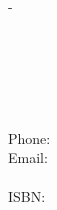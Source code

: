 \cleardoublepage
\thispagestyle{empty}
\phantom{\ }
\newpage
\AtBeginShipoutNext{\AtBeginShipoutNext{\AtBeginShipoutDiscard}}
\begin{titlingpage}
	\sffamily
	\thispagestyle{empty}
	\calccentering{\unitlength}
	\begin{adjustwidth}{\unitlength}{-\unitlength}
		\begin{adjustwidth}{-0.5cm}{-0.5cm}
			
			\noindent
			\thUniversityNameEN\\
			\thGroupNameEN\\
			\thGroupAddressStreetEN\\
			\thGroupAddressZIPCityEN\\
			\thGroupAddressCountryEN\\
			Phone: \thGroupAddressPhone\\
			Email: \thGroupAddressEmail\\
			\thGroupAddressWWW\\[1cm]
			ISBN: \thISBN
		\end{adjustwidth}
	\end{adjustwidth}
\end{titlingpage}
